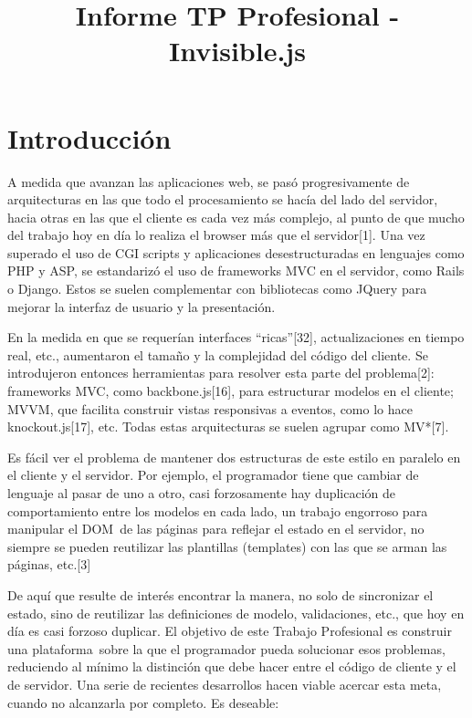 \documentclass[doc,helv,longtable]{article}
\begin{document}
\title{Informe TP Profesional - Invisible.js}
\maketitle

\section{Introducción}

A medida que avanzan las aplicaciones web, se pasó progresivamente de arquitecturas en las que todo el procesamiento se hacía del lado del servidor, hacia otras en las que el cliente es cada vez más complejo, al punto de que mucho del trabajo hoy en día lo realiza el browser más que el servidor[1]. Una vez superado el uso de CGI scripts y aplicaciones desestructuradas en lenguajes como PHP y ASP, se estandarizó el uso de frameworks MVC en el servidor, como Rails o Django. Estos se suelen complementar con bibliotecas como JQuery para mejorar la interfaz de usuario y la presentación. 

En la medida en que se requerían interfaces “ricas”[32], actualizaciones en tiempo real, etc., aumentaron el tamaño y la complejidad del código del cliente. Se introdujeron entonces herramientas para resolver esta parte del problema[2]: frameworks MVC, como backbone.js[16], para estructurar modelos en el cliente; MVVM, que facilita construir vistas responsivas a eventos, como lo hace knockout.js[17], etc. Todas estas arquitecturas se suelen agrupar como MV*[7].

Es fácil ver el problema de mantener dos estructuras de este estilo en paralelo en el cliente y el servidor. Por ejemplo, el programador tiene que cambiar de lenguaje al pasar de uno a otro, casi forzosamente hay duplicación de comportamiento entre los modelos en cada lado, un trabajo engorroso para manipular el DOM de las páginas para reflejar el estado en el servidor, no siempre se pueden reutilizar las plantillas (templates) con las que se arman las páginas, etc.[3]

De aquí que resulte de interés encontrar la manera, no solo de sincronizar el estado, sino de reutilizar las definiciones de modelo, validaciones, etc., que hoy en día es casi forzoso duplicar. El objetivo de este Trabajo Profesional es construir una plataforma sobre la que el programador pueda solucionar esos problemas, reduciendo al mínimo la distinción que debe hacer entre el código de cliente y el de servidor. Una serie de recientes desarrollos hacen viable acercar esta meta, cuando no alcanzarla por completo. Es deseable:
\end{document}
